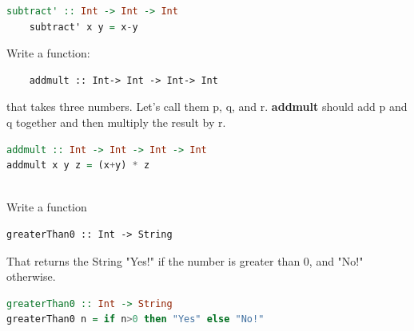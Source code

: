 \documentclass{article}
\begin{document}
\begin{solution}
  \begin{lstlisting}[language=Haskell]
    subtract' :: Int -> Int -> Int
    subtract' x y = x-y
  \end{lstlisting} 
  
  \end{solution}
  
\begin{exercise}
  Write a function:
  \begin{lstlisting}
    addmult :: Int-> Int -> Int-> Int
  \end{lstlisting}   
  that takes three numbers. Let’s call them p, q, and r. \textbf{addmult}  should add p and q together and then multiply the result by r.
\end{exercise}

\begin{solution}
\begin{lstlisting}[language=Haskell]
addmult :: Int -> Int -> Int -> Int
addmult x y z = (x+y) * z
  
\end{lstlisting}
  \end{solution}



\begin{exercise}
Write a function 
\begin{lstlisting}
greaterThan0 :: Int -> String
\end{lstlisting}   
That returns the String "Yes!" if the number is greater than 0, and "No!" otherwise. 
\end{exercise}

\begin{solution}
  \begin{lstlisting}[language=Haskell]
greaterThan0 :: Int -> String
greaterThan0 n = if n>0 then "Yes" else "No!"
    
  \end{lstlisting}
  \end{solution}
\end{document}

